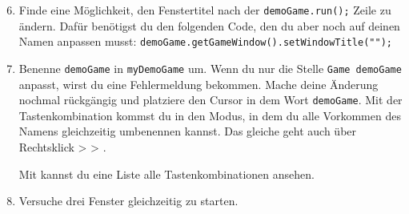 \begin{enumerate} \setcounter{enumi}{5}
    \item \optional Finde eine Möglichkeit, den Fenstertitel nach der \lstinline{demoGame.run();} Zeile zu ändern.
        Dafür benötigst du den folgenden Code, den du aber noch auf deinen Namen anpassen musst: \lstinline{demoGame.getGameWindow().setWindowTitle("");}
    \item \optional Benenne \lstinline{demoGame} in \lstinline{myDemoGame} um.
        Wenn du nur die Stelle \lstinline{Game demoGame} anpasst, wirst du eine Fehlermeldung bekommen.
        Mache deine Änderung nochmal rückgängig und platziere den Cursor in dem Wort \lstinline{demoGame}.
        Mit der Tastenkombination  kommst du in den  Modus, in dem du alle Vorkommen des Namens gleichzeitig umbenennen kannst.
        Das gleiche geht auch über Rechtsklick >  > .

        Mit  kannst du eine Liste alle Tastenkombinationen ansehen.
    \item \optional Versuche drei Fenster gleichzeitig zu starten.
\end{enumerate}
